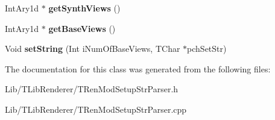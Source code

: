 \begin{DoxyCompactItemize}
\item 
\mbox{\label{class_t_ren_mod_setup_str_parser_acc605004622037e30e16218cc06fde02}} 
Int\+Ary1d $\ast$ {\bfseries get\+Synth\+Views} ()
\item 
\mbox{\label{class_t_ren_mod_setup_str_parser_acc291ab1162389a201e1418a2e24218e}} 
Int\+Ary1d $\ast$ {\bfseries get\+Base\+Views} ()
\item 
\mbox{\label{class_t_ren_mod_setup_str_parser_a2c6e11d84220a65c69f0f266724fc0f2}} 
Void {\bfseries set\+String} (Int i\+Num\+Of\+Base\+Views, T\+Char $\ast$pch\+Set\+Str)
\end{DoxyCompactItemize}


The documentation for this class was generated from the following files\+:\begin{DoxyCompactItemize}
\item 
Lib/\+T\+Lib\+Renderer/T\+Ren\+Mod\+Setup\+Str\+Parser.\+h\item 
Lib/\+T\+Lib\+Renderer/T\+Ren\+Mod\+Setup\+Str\+Parser.\+cpp\end{DoxyCompactItemize}
